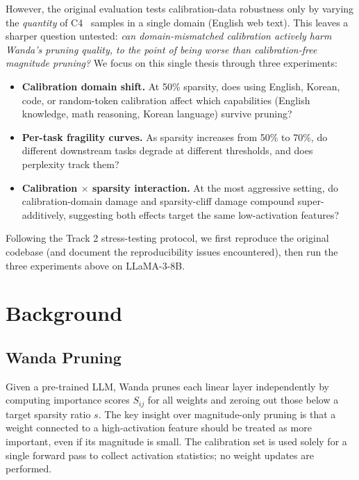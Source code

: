 \documentclass{article}
\begin{document}
However, the original evaluation tests calibration-data robustness only by
varying the \emph{quantity} of C4~\cite{c4} samples in a single domain
(English web text). This leaves a sharper question untested: \emph{can
domain-mismatched calibration actively harm Wanda's pruning quality, to the
point of being worse than calibration-free magnitude pruning?}
We focus on this single thesis through three experiments:

\begin{itemize}
  \item \textbf{Calibration domain shift.} At 50\% sparsity, does using
        English, Korean, code, or random-token calibration affect which
        capabilities (English knowledge, math reasoning, Korean language)
        survive pruning?
  \item \textbf{Per-task fragility curves.} As sparsity increases from 50\%
        to 70\%, do different downstream tasks degrade at different
        thresholds, and does perplexity track them?
  \item \textbf{Calibration $\times$ sparsity interaction.} At the
        most aggressive setting, do calibration-domain damage and
        sparsity-cliff damage compound super-additively, suggesting
        both effects target the same low-activation features?
\end{itemize}

Following the Track 2 stress-testing protocol, we first reproduce the
original codebase (and document the reproducibility issues encountered),
then run the three experiments above on LLaMA-3-8B.

\section{Background}

\subsection{Wanda Pruning}

Given a pre-trained LLM, Wanda prunes each linear layer independently by
computing importance scores $S_{ij}$ for all weights and zeroing out those
below a target sparsity ratio $s$. The key insight over magnitude-only pruning
is that a weight connected to a high-activation feature should be treated as
more important, even if its magnitude is small. The calibration set is used
solely for a single forward pass to collect activation statistics; no weight
updates are performed.
\end{document}
